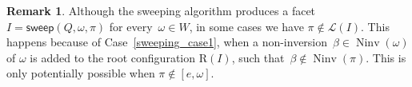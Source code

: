 \documentclass[reqno]{amsart}
\theoremstyle{definition}
\newtheorem{remark}[theorem]{Remark}
\DeclareMathOperator{\Ninv}{Ninv} %
\newcommand{\linearExtensions}{\mathcal{L}} %
\newcommand{\Roots}{\mathrm{R}} %
\newcommand{\sweepingAlgorithm}{\mathsf{sweep}} %
\begin{document}
\begin{remark}
    Although the sweeping algorithm produces a facet $I=\sweepingAlgorithm(Q,\omega,\pi)$ for every~${\omega\in W}$, in some cases we have $\pi \notin \linearExtensions(I)$. 
    This happens because of Case~\eqref{sweeping_case1}, when a non-inversion~$\beta\in \Ninv(\omega)$ of $\omega$ is added to the root configuration $\Roots(I)$, such that~$\beta \notin \Ninv(\pi)$. This is only potentially possible when $\pi \notin [e,\omega]$.
\end{remark}




\label{sec:biblio}

\end{document}
